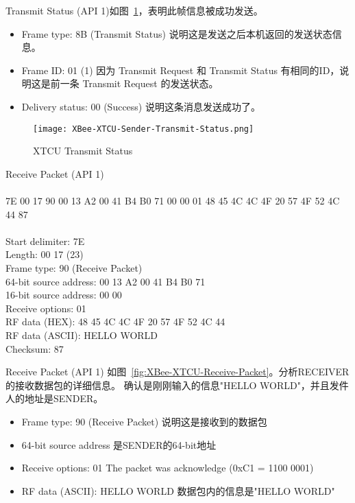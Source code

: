 Transmit Status (API 1)如图~\ref{fig:XBee-XTCU-Sender-Transmit-Status}，表明此帧信息被成功发送。

\begin{itemize}
    \item Frame type: 8B (Transmit Status) 说明这是发送之后本机返回的发送状态信息。
    \item Frame ID: 01 (1) 因为 Transmit Request 和 Transmit Status 有相同的ID，说明这是前一条 Transmit Request 的发送状态。
    \item Delivery status: 00 (Success) 说明这条消息发送成功了。
\end{itemize}

\begin{figure}[htbp]
    \centering
    \texttt{[image: XBee-XTCU-Sender-Transmit-Status.png]}
    \caption{XTCU Transmit Status}
    \label{fig:XBee-XTCU-Sender-Transmit-Status}
\end{figure}

\begin{tcolorbox}
    Receive Packet (API 1)
    \\ 
    \\ 7E 00 17 90 00 13 A2 00 41 B4 B0 71 00 00 01 48 45 4C 4C 4F 20 57 4F 52 4C 44 87
    \\ 
    \\ Start delimiter: 7E
    \\ Length: 00 17 (23)
    \\ Frame type: 90 (Receive Packet)
    \\ 64-bit source address: 00 13 A2 00 41 B4 B0 71
    \\ 16-bit source address: 00 00
    \\ Receive options: 01
    \\ RF data (HEX): 48 45 4C 4C 4F 20 57 4F 52 4C 44
    \\ RF data (ASCII): HELLO WORLD
    \\ Checksum: 87
\end{tcolorbox}


Receive Packet (API 1) 如图~\ref{fig:XBee-XTCU-Receive-Packet}。分析RECEIVER的接收数据包的详细信息。 确认是刚刚输入的信息"HELLO WORLD"，并且发件人的地址是SENDER。

\begin{itemize}
    \item Frame type: 90 (Receive Packet) 说明这是接收到的数据包
    \item 64-bit source address 是SENDER的64-bit地址
    \item Receive options: 01 The packet was acknowledge (0xC1 = 1100 0001)
    \item RF data (ASCII): HELLO WORLD 数据包内的信息是"HELLO WORLD"
\end{itemize}

